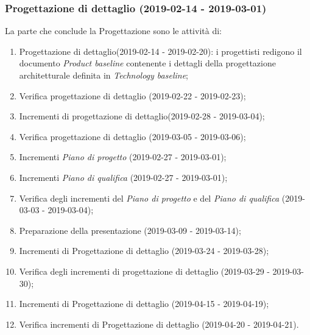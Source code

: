 		\subsubsection{Progettazione di dettaglio (2019-02-14 - 2019-03-01)\\} La parte che conclude la Progettazione sono le attività di:
			\begin{enumerate}[label = 3.3.\arabic*)]
				\item Progettazione di dettaglio(2019-02-14 - 2019-02-20): i progettisti redigono il documento \textit{Product baseline} contenente i dettagli della progettazione architetturale definita in \textit{Technology baseline};
				\item Verifica progettazione di dettaglio (2019-02-22 - 2019-02-23);
				\item Incrementi di progettazione di dettaglio(2019-02-28 - 2019-03-04);
				\item Verifica progettazione di dettaglio (2019-03-05 - 2019-03-06);
				\item Incrementi \textit{Piano di progetto} (2019-02-27 - 2019-03-01);
				\item Incrementi \textit{Piano di qualifica} (2019-02-27 - 2019-03-01);	
				\item Verifica degli incrementi del \textit{Piano di progetto} e del \textit{Piano di qualifica} (2019-03-03 - 2019-03-04);
				\item Preparazione della presentazione (2019-03-09 - 2019-03-14);
				\item Incrementi di Progettazione di dettaglio (2019-03-24 - 2019-03-28);
				\item Verifica degli incrementi di progettazione di dettaglio (2019-03-29 - 2019-03-30);
				\item Incrementi di Progettazione di dettaglio (2019-04-15 - 2019-04-19);
				\item Verifica incrementi di Progettazione di dettaglio (2019-04-20 - 2019-04-21).
			\end{enumerate}
	
